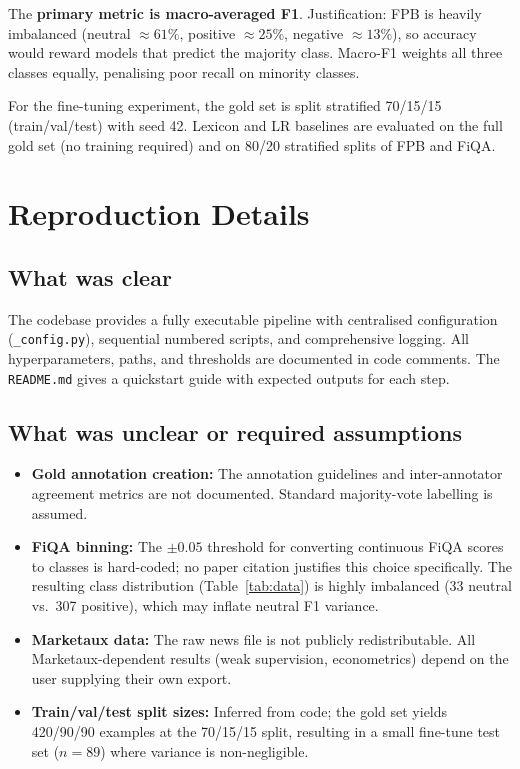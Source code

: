 \documentclass[11pt]{article}
\begin{document}
The \textbf{primary metric is macro-averaged F1}. Justification: FPB is
heavily imbalanced (neutral $\approx 61\%$, positive $\approx 25\%$, negative
$\approx 13\%$), so accuracy would reward models that predict the majority
class. Macro-F1 weights all three classes equally, penalising poor recall on
minority classes.

For the fine-tuning experiment, the gold set is split stratified 70/15/15
(train/val/test) with seed 42. Lexicon and LR baselines are evaluated on the
full gold set (no training required) and on 80/20 stratified splits of FPB
and FiQA.

\section{Reproduction Details}
\label{sec:repro}

\subsection{What was clear}
The codebase provides a fully executable pipeline with centralised
configuration (\texttt{\_config.py}), sequential numbered scripts, and
comprehensive logging. All hyperparameters, paths, and thresholds are
documented in code comments. The \texttt{README.md} gives a quickstart guide
with expected outputs for each step.

\subsection{What was unclear or required assumptions}
\begin{itemize}
  \item \textbf{Gold annotation creation:} The annotation guidelines and
    inter-annotator agreement metrics are not documented. Standard
    majority-vote labelling is assumed.
  \item \textbf{FiQA binning:} The $\pm 0.05$ threshold for converting
    continuous FiQA scores to classes is hard-coded; no paper citation
    justifies this choice specifically. The resulting class distribution
    (Table~\ref{tab:data}) is highly imbalanced (33 neutral vs.\ 307
    positive), which may inflate neutral F1 variance.
  \item \textbf{Marketaux data:} The raw news file is not publicly
    redistributable. All Marketaux-dependent results (weak supervision,
    econometrics) depend on the user supplying their own export.
  \item \textbf{Train/val/test split sizes:} Inferred from code; the gold set
    yields 420/90/90 examples at the 70/15/15 split, resulting in a small
    fine-tune test set ($n=89$) where variance is non-negligible.
\end{itemize}
\end{document}
